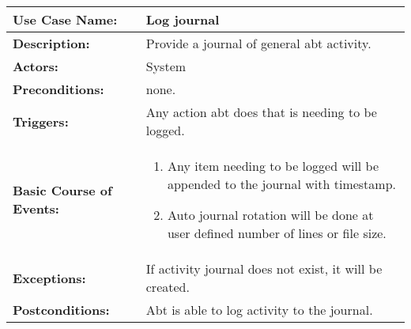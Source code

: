 
\begin{tabularx}{\linewidth}{|l|X|}
\hline
\textbf{Use Case Name:} & \textbf{Log journal} \\
\hline
\textbf{Description:} & 
Provide a journal of general abt activity. \\
\hline
\textbf{Actors:} & System \\
\hline
\textbf{Preconditions:} & none. \\
\hline
\textbf{Triggers:} & Any action abt does that is needing to be logged. \\
\hline
\textbf{Basic Course of Events:} & 
\begin{minipage}{\linewidth} 
  \vspace{0.05em}
  \begin{enumerate}
    \item Any item needing to be logged will be appended to the journal with timestamp.
    \item Auto journal rotation will be done at user defined number of lines or file size.
  \end{enumerate}
  \vspace{0.05em}
\end{minipage}
\\
\hline
\textbf{Exceptions:} & 
If activity journal does not exist, it will be created. \\
\hline 
\textbf{Postconditions:} &
Abt is able to log activity to the journal. \\
\hline
\end{tabularx}


